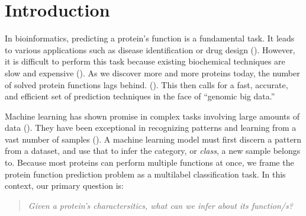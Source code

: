 %
%
%
%
%

\chapter{Introduction}
\label{Introduction}

\par In bioinformatics, predicting a protein's function is a fundamental task.
It leads to various applications such as disease identification or drug design
(\cite{baldi2001bioinformatics}). However, it is difficult to perform this task
because existing biochemical techniques are slow and expensive
(\cite{cozzetto2017computational}). As we discover more and more proteins
today, the number of solved protein functions lags behind.
(\cite{gaudet2017gene}). This then calls for a fast, accurate, and efficient
set of prediction techniques in the face of ``genomic big data.''
  
\par Machine learning has shown promise in complex tasks involving large
amounts of data (\cite{chen2014data}). They have been exceptional in
recognizing patterns and learning from a vast number of samples
(\cite{lecun2015deep}). A machine learning model must first
discern a pattern from a dataset, and use that to infer the category, or
\textit{class}, a new sample belongs to. Because most proteins can perform
multiple functions at once, we frame the protein function prediction problem
as a multilabel classification task. In this context, our primary question is:

\begin{quote}
    \itshape
    \small
    Given a protein's charactersitics, what can we infer about its function/s?
\end{quote}

